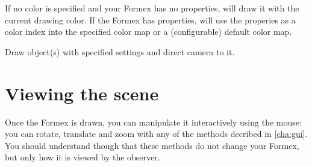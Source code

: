 If no color is specified and your Formex has no properties, \pyformex will draw it with the current drawing color. If the Formex has properties, \pyformex will use the properies as a color index into the specified color map or a (configurable) default color map.

Draw object(s) with specified settings and direct camera to it.







 
\section{Viewing the scene}
Once the Formex is drawn, you can manipulate it interactively using the mouse: you can rotate, translate and zoom with any of the methods decribed in \ref{cha:gui}. You should understand though that these methods do not change your Formex, but only how it is viewed by the observer. 

